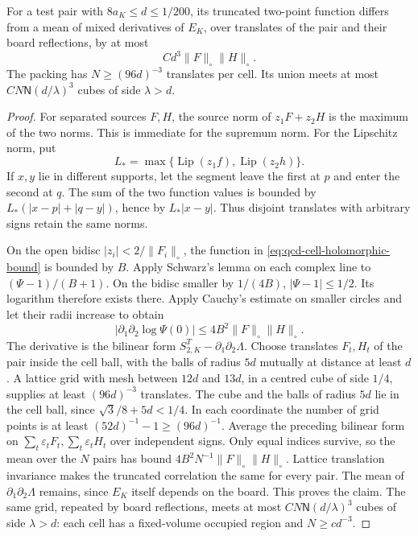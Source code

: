 \documentclass[11pt,letterpaper,reqno]{amsart}
\makeatletter
\theoremstyle{definition}
\newcommand{\ms@minorstart}{%
  \pushQED{\qed}\renewcommand{\qedsymbol}{$\blacksquare$}}
\newenvironment{lemma}[1][]{\ms@minorstart\ms@lemma[#1]}
  {\popQED\endms@lemma}
\theoremstyle{remark}
\makeatother
\begin{document}
\begin{lemma}[Packing with signs]\label{C-408-20}
For a test pair with $8a_K\le d\le1/200$, its truncated two-point function
differs from a mean of mixed derivatives of $E_K$, over translates
of the pair and their board reflections, by at most
\[
 C d^3\|F\|_\circ\|H\|_\circ.
\]
The packing has $N\ge(96d)^{-3}$ translates per cell. Its union
meets at most $C N\mathsf N(d/\lambda)^3$ cubes of side
$\lambda>d$.
\end{lemma}

\begin{proof}
For separated sources $F,H$, the source norm of $z_1F+z_2H$
is the maximum of the two norms. This is immediate for the supremum
norm. For the Lipschitz norm, put
\[
 L_*=\max\{\operatorname{Lip}(z_1f),\operatorname{Lip}(z_2h)\}.
\]
If $x,y$ lie in different supports,
let the segment leave the first at $p$ and enter the second at $q$.
The sum of the two function values is bounded by
$L_*(|x-p|+|q-y|)$, hence by
$L_*|x-y|$. Thus disjoint translates with arbitrary
signs retain the same norms.

On the open bidisc $|z_i|<2/\|F_i\|_\circ$, the function in
\eqref{eq:qcd-cell-holomorphic-bound} is bounded by $B$.
Apply Schwarz's lemma on each complex line to $(\Psi-1)/(B+1)$.
On the bidisc smaller by $1/(4B)$, $|\Psi-1|\le1/2$.
Its logarithm therefore exists there. Apply Cauchy's estimate
on smaller circles and let their radii increase to obtain
\[
 |\partial_1\partial_2\log\Psi(0)|
                  \le4B^2\|F\|_\circ\|H\|_\circ.
\]
The derivative is the bilinear form $S^T_{2,K}-\partial_1\partial_2\Lambda$.
Choose translates $F_t,H_t$ of the pair inside the cell ball,
with the balls of radius $5d$ mutually at distance at least $d$.
A lattice grid with mesh between $12d$ and $13d$, in a centred
cube of side $1/4$, supplies at least $(96d)^{-3}$ translates.
The cube and the balls of radius $5d$ lie in the cell ball, since
$\sqrt3/8+5d<1/4$. In each coordinate the number of grid points
is at least $(52d)^{-1}-1\ge(96d)^{-1}$.
Average the preceding bilinear form on
$\sum_t\varepsilon_tF_t,\sum_t\varepsilon_tH_t$ over independent
signs. Only equal indices survive, so the mean over the $N$ pairs
has bound $4B^2N^{-1}\|F\|_\circ\|H\|_\circ$.
Lattice translation invariance makes the truncated correlation the
same for every pair. The mean of $\partial_1\partial_2\Lambda$
remains, since $E_K$ itself depends on the board. This proves the
claim. The same grid, repeated by board reflections, meets at most
$C N\mathsf N(d/\lambda)^3$ cubes of side $\lambda>d$:
each cell has a fixed-volume occupied region and $N\ge c d^{-3}$.
\end{proof}
\end{document}
